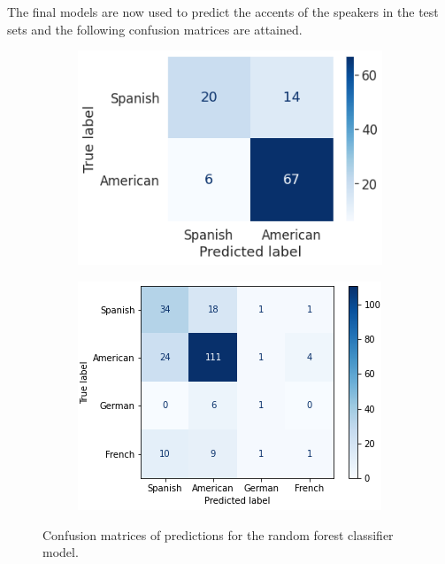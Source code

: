 \documentclass[conference]{IEEEtran}
\begin{document}

The final models are now used to predict the accents of the speakers in the test sets and the following confusion matrices are attained.

\begin{figure}[H]
\begin{subfigure}[t]{0.24\textwidth}
  \centering
    \includegraphics[width=\textwidth]{Figures/BLUE_binary_CM.png}
    \label{fig:binCM}
\end{subfigure}
\begin{subfigure}[t]{0.24\textwidth}
    \centering
    \includegraphics[width=\textwidth]{Figures/BLUE_multiclass_CM.png}
    \label{fig:multiCM}
\end{subfigure}
\caption{Confusion matrices of predictions for the random forest classifier model.}
\label{fig:RFCMs}
\end{figure}
\end{document}
